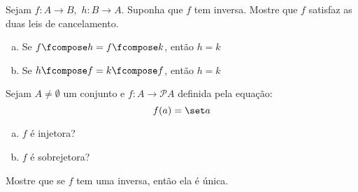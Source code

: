 \begin{exercise}
    Sejam $f: A \to B,$ $ h: B \to A$. Suponha que $f$ tem inversa. Mostre que $f$ satisfaz as duas leis de cancelamento.
    \begin {enumerate}[(a)]
        \item Se $f \fcompose h = f \fcompose k$, então $h = k$
        \item Se $h \fcompose f = k \fcompose f$, então $h = k$
    \end {enumerate}
\end{exercise}

\begin{exercise}
    Sejam $A \not = \emptyset$ um conjunto e $f : A \to \mathcal P A$ definida pela equação:
    $$
        f(a) = \set a
    $$
    \begin {enumerate} [(a)]
        \item $f$ é injetora?
        \item $f$ é sobrejetora?
    \end {enumerate}
\end{exercise}

\begin{exercise}
    Mostre que se $f$ tem uma inversa, então ela é única.
\end{exercise}
